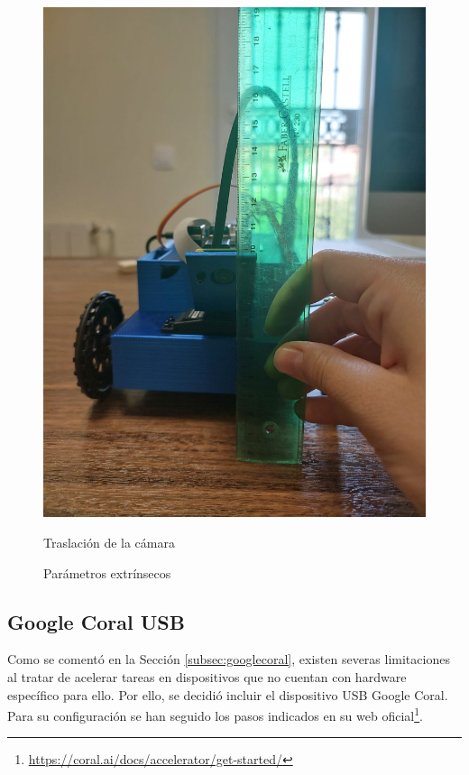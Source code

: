 \begin{figure}[ht!]
\begin{minipage}{0.35\linewidth}
		\includegraphics[width=\linewidth]{figs/cap6/traslacion.jpeg}
		\caption*{\centering Traslación de la cámara} 
	\end{minipage}
	\caption{Parámetros extrínsecos}
	\label{fig:extrinseco}
\end{figure}


\subsection{Google Coral USB}
\label{subsec:configgcoral}

Como se comentó en la Sección \ref{subsec:googlecoral}, existen severas limitaciones al tratar de acelerar tareas en dispositivos que no cuentan con hardware específico para ello. Por ello, se decidió incluir el dispositivo USB Google Coral. Para su configuración se han seguido los pasos indicados en su web oficial\footnote{\url{https://coral.ai/docs/accelerator/get-started/}}. 


